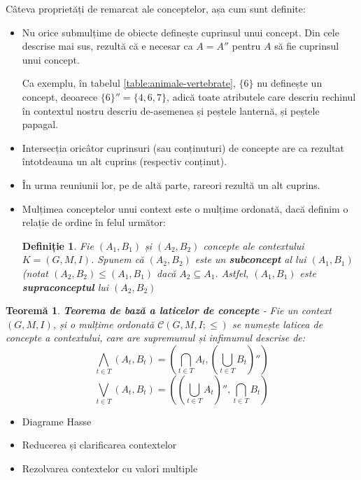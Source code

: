 \documentclass[12pt, a4paper, twoside, romanian]{teza-upb}
\newtheorem{defn}{Definiție}
\newtheorem{theorem}{Teoremă}
\begin{document}
  Câteva proprietăți de remarcat ale conceptelor, așa cum sunt definite:
  \begin{itemize}
        \item Nu orice submulțime de obiecte definește cuprinsul unui concept. Din cele descrise mai sus, rezultă că e necesar ca $ A = A''$ pentru $A$ să fie cuprinsul unui concept.

        Ca exemplu, în tabelul \ref{table:animale-vertebrate}, $\{6\}$ nu definește un concept, deoarece $\{6\}'' = \{4, 6, 7\}$, adică toate atributele care descriu rechinul în contextul nostru descriu de-asemenea și peștele lanternă, și peștele papagal.
        \item Intersecția oricâtor cuprinsuri (sau conținuturi) de concepte are ca rezultat întotdeauna un alt cuprins (respectiv conținut).
        \item În urma reuniunii lor, pe de altă parte, rareori rezultă un alt cuprins.
        \item Mulțimea conceptelor unui context este o mulțime ordonată, dacă definim o relație de ordine în felul următor:
          \begin{defn}
            Fie $(A_1, B_1)$ și $(A_2, B_2)$ concepte ale contextului $K = (G, M, I)$. Spunem că $(A_2, B_2)$ este un \textbf{subconcept} al lui $(A_1, B_1)$ (notat $(A_2, B_2) \le (A_1, B_1)$ dacă $A_2 \subseteq A_1$. Astfel, $(A_1, B_1)$ este \textbf{supraconceptul} lui $(A_2, B_2)$
          \end{defn}
  \end{itemize}

    \begin{theorem}
      \textbf{Teorema de bază a laticelor de concepte} - 
      Fie un context $(G, M, I)$, și o mulțime ordonată $\mathcal C \left(G, M, I; \le \right)$ se numește laticea de concepte a contextului, care are supremumul și infimumul descrise de:
      $$ \bigwedge_{t \in T}(A_t, B_t) = \left( \bigcap_{t \in T} A_t, \left( \bigcup_{t \in T} B_t \right)'' \right)$$
      $$ \bigvee_{t \in T} (A_t, B_t) = \left( \left( \bigcup_{t \in T} A_t \right)'', \bigcap_{ t \in T} B_t \right)$$
    \end{theorem}

  

    \begin{itemize}
      \item Diagrame Hasse
      \item Reducerea și clarificarea contextelor
      \item Rezolvarea contextelor cu valori multiple
    \end{itemize}
\end{document}

